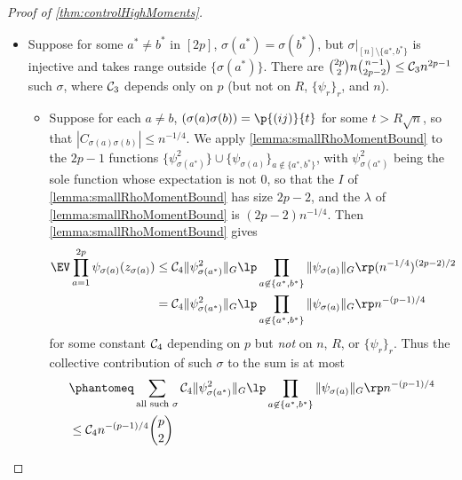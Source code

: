 \documentclass[main.tex]{subfiles}
\begin{document}
\begin{proof}[Proof of \cref{thm:controlHighMoments}]
\begin{itemize}
\begin{itemize}
    \end{itemize}
    \item
        Suppose for some $a^* \ne b^*$ in $[2p]$, $\sigma(a^*) = \sigma(b^*)$, but $\sigma|_{[n] \setminus \{a^*, b^*\}}$ is injective and takes range outside $\{\sigma(a^*)\}$.
        There are $\binom {2p} 2 n \binom{n-1}{2p-2} \le \mathcal{C}_3 n^{2p-1}$ such $\sigma$, where $\mathcal{C}_3$ depends only on $p$ (but not on $R$, $\{\psi_r\}_r$, and $n$).
        \begin{itemize}
            \item 
                Suppose for each $a\ne b$, $(\sigma(a)\sigma(b)) = \p{(ij)}{t}$ for some $t > R\sqrt n$, so that $|C_{\sigma(a)\sigma(b)}| \le n^{-1/4}.$
                We apply \cref{lemma:smallRhoMomentBound} to the $2p-1$ functions $\{\psi_{\sigma(a^*)}^2\} \cup \{\psi_{\sigma(a)}\}_{a \not \in \{a^*, b^*\}}$, with $\psi_{\sigma(a^*)}^2$ being the sole function whose expectation is not 0, so that the $I$ of \cref{lemma:smallRhoMomentBound} has size $2p-2$, and the $\lambda$ of \cref{lemma:smallRhoMomentBound} is $(2p-2)n^{-1/4}.$
                Then \cref{lemma:smallRhoMomentBound} gives
                \begin{align*}
                    \EV \prod_{a=1}^{2p} \psi_{\sigma(a)}(z_{\sigma(a)})
                        &\le
                            \CC_4
                            \|\psi^2_{\sigma(a^*)}\|_G
                            \lp \prod_{a\not\in\{a^*, b^*\}} \|\psi_{\sigma(a)}\|_G \rp
                            (n^{-1/4})^{(2p-2)/2}
                            \\
                        &=
                            \CC_4
                            \|\psi^2_{\sigma(a^*)}\|_G
                            \lp \prod_{a\not\in\{a^*, b^*\}} \|\psi_{\sigma(a)}\|_G \rp
                            n^{-(p-1)/4}
                \end{align*}
                for some constant $\mathcal{C}_4$ depending on $p$ but \emph{not} on $n$, $R$, or $\{\psi_r\}_r$.
                Thus the collective contribution of such $\sigma$ to the sum is at most
                \begin{align*}
                    &\phantomeq
                        \sum_{\text{all such }\sigma} \CC_4
                            \|\psi^2_{\sigma(a^*)}\|_G
                            \lp \prod_{a\not\in\{a^*, b^*\}} \|\psi_{\sigma(a)}\|_G \rp
                            n^{-(p-1)/4}
                        \\
                    &\le
                        \CC_4 n^{-(p-1)/4} \binom p 2

\end{align*}
\end{itemize}
\end{itemize}
\end{proof}
\end{document}
